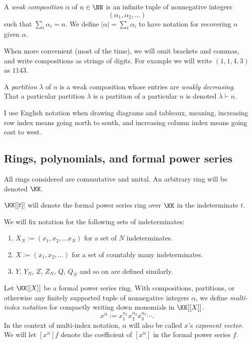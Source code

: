 \documentclass{article}
\begin{document}
A \textit{weak composition} $\alpha$ of $n \in \NN$ is an infinite tuple of nonnegative integers 
\[
    (\alpha_1, \alpha_2, \ldots)
\]
such that $\sum_i \alpha_i = n$. 
We define $|\alpha| = \sum_i \alpha_i$ to have notation for recovering $n$ given $\alpha$.

When more convenient (most of the time), we will omit brackets and commas, and write compositions as strings of digits. For example we will write $(1,1,4,3)$ as $1143$.

A \textit{partition} $\lambda$ of $n$ is a weak composition whose entries are \textit{weakly decreasing}. 
That a particular partition $\lambda$ is a partition of a particular $n$ is denoted $\lambda \vdash n$. 

I use English notation when drawing diagrams and tableaux, meaning, increasing row index means going north to south, and increasing column index means going east to west.

\subsection*{Rings, polynomials, and formal power series}

All rings considered are commutative and unital. An arbitrary ring will be denoted $\KK$. 

$\KK[[t]]$ will denote the formal power series ring over $\KK$ in the indeterminate $t$.

We will fix notation for the following sets of indeterminates:
\begin{enumerate}[label=(\alph*)]
    \item $X_N := (x_1, x_2, \ldots x_N)$ for a set of $N$ indeterminates.
    \item $X := (x_1, x_2, \ldots)$ for a set of countably many indeterminates.
    \item $Y$, $Y_N$, $Z$, $Z_N$, $Q$, $Q_N$ and so on are defined similarly.
\end{enumerate}

Let $\KK[[X]]$ be a formal power series ring. With compositions, partitions, or otherwise any finitely supported tuple of nonnegative integers $\alpha$, we define \textit{multi-index notation} for compactly writing down monomials in $\KK[[X]]$.
\[
    x^\alpha := x_1^{\alpha_1}x_2^{\alpha_2}x_3^{\alpha_3}\cdots.
\]
In the context of multi-index notation, $\alpha$ will also be called $x$'s \textit{exponent vector}.
We will let $[x^\alpha]f$ denote the coefficient of $[x^\alpha]$ in the formal power series $f$.
\end{document}

